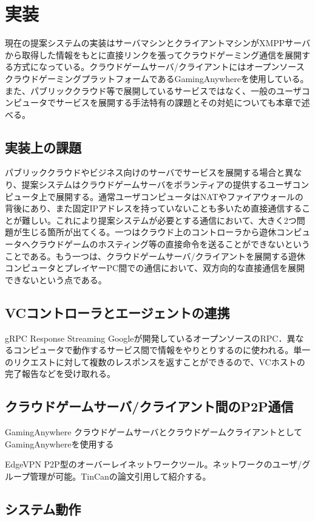 \section{実装}

現在の提案システムの実装はサーバマシンとクライアントマシンがXMPPサーバから取得した情報をもとに直接リンクを張ってクラウドゲーミング通信を展開する方式になっている。クラウドゲームサーバ/クライアントにはオープンソースクラウドゲーミングプラットフォームであるGamingAnywhereを使用している。また、パブリッククラウド等で展開しているサービスではなく、一般のユーザコンピュータでサービスを展開する手法特有の課題とその対処についても本章で述べる。

\subsection{実装上の課題}
パブリッククラウドやビジネス向けのサーバでサービスを展開する場合と異なり、提案システムはクラウドゲームサーバをボランティアの提供するユーザコンピュータ上で展開する。通常ユーザコンピュータはNATやファイアウォールの背後にあり、また固定IPアドレスを持っていないことも多いため直接通信することが難しい。これにより提案システムが必要とする通信において、大きく2つ問題が生じる箇所が出てくる。一つはクラウド上のコントローラから遊休コンピュータへクラウドゲームのホスティング等の直接命令を送ることができないということである。もう一つは、クラウドゲームサーバ/クライアントを展開する遊休コンピュータとプレイヤーPC間での通信において、双方向的な直接通信を展開できないという点である。

\subsection{VCコントローラとエージェントの連携}
gRPC Response Streaming
Googleが開発しているオープンソースのRPC．異なるコンピュータで動作するサービス間で情報をやりとりするのに使われる。単一のリクエストに対して複数のレスポンスを返すことができるので、VCホストの完了報告などを受け取れる。

\subsection{クラウドゲームサーバ/クライアント間のP2P通信}

GamingAnywhere
クラウドゲームサーバとクラウドゲームクライアントとしてGamingAnywhereを使用する

EdgeVPN
P2P型のオーバーレイネットワークツール。ネットワークのユーザ/グループ管理が可能。TinCanの論文引用して紹介する。

\subsection{システム動作}

